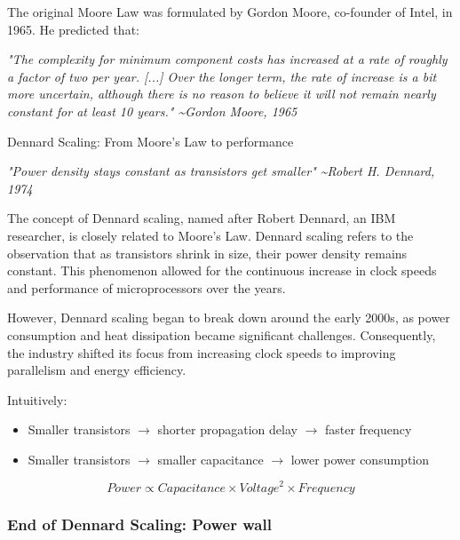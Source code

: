 The original Moore Law was formulated by Gordon Moore, co-founder of Intel, in 1965. He predicted that:

\begin{definitionblock}
    \textit{"The complexity for minimum component costs has increased at a rate of roughly a factor of two per year. [...] Over the longer term, the rate of increase is a bit more uncertain, although there is no reason to believe it will not remain nearly constant for at least 10 years." \newline
    \phantom{ } \hfill \textasciitilde Gordon Moore, 1965}
\end{definitionblock}

Dennard Scaling: From Moore's Law to performance

\begin{definitionblock}
    \textit{"Power density stays constant as transistors get smaller" \newline
    \phantom{ } \hfill \textasciitilde Robert H. Dennard, 1974}
\end{definitionblock}

The concept of Dennard scaling, named after Robert Dennard, an IBM researcher, is closely related to Moore's Law. Dennard scaling refers to the observation that as transistors shrink in size, their power density remains constant. This phenomenon allowed for the continuous increase in clock speeds and performance of microprocessors over the years. 

However, Dennard scaling began to break down around the early 2000s, as power consumption and heat dissipation became significant challenges. Consequently, the industry shifted its focus from increasing clock speeds to improving parallelism and energy efficiency.

\vspace{0.5em}

Intuitively:

\begin{itemize}
    \item Smaller transistors $\rightarrow$ shorter propagation delay $\rightarrow$ faster frequency 
    \item  Smaller transistors $\rightarrow$ smaller capacitance $\rightarrow$ lower power consumption
\end{itemize}

$$
Power \propto Capacitance \times Voltage^2 \times Frequency
$$

\subsubsection{End of Dennard Scaling: Power wall}

